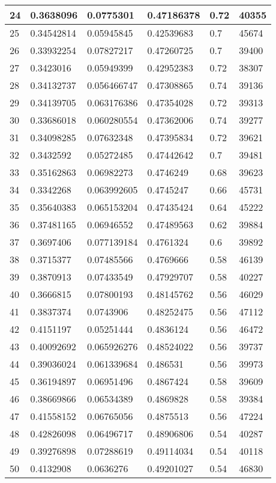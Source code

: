 \begin{longtable}{|l|l|l|l|l|l|}
24 & 0.3638096 & 0.0775301 & 0.47186378 & 0.72 & 40355 \\ \hline 
25 & 0.34542814 & 0.05945845 & 0.42539683 & 0.7 & 45674 \\ \hline 
26 & 0.33932254 & 0.07827217 & 0.47260725 & 0.7 & 39400 \\ \hline 
27 & 0.3423016 & 0.05949399 & 0.42952383 & 0.72 & 38307 \\ \hline 
28 & 0.34132737 & 0.056466747 & 0.47308865 & 0.74 & 39136 \\ \hline 
29 & 0.34139705 & 0.063176386 & 0.47354028 & 0.72 & 39313 \\ \hline 
30 & 0.33686018 & 0.060280554 & 0.47362006 & 0.74 & 39277 \\ \hline 
31 & 0.34098285 & 0.07632348 & 0.47395834 & 0.72 & 39621 \\ \hline 
32 & 0.3432592 & 0.05272485 & 0.47442642 & 0.7 & 39481 \\ \hline 
33 & 0.35162863 & 0.06982273 & 0.4746249 & 0.68 & 39623 \\ \hline 
34 & 0.3342268 & 0.063992605 & 0.4745247 & 0.66 & 45731 \\ \hline 
35 & 0.35640383 & 0.065153204 & 0.47435424 & 0.64 & 45222 \\ \hline 
36 & 0.37481165 & 0.06946552 & 0.47489563 & 0.62 & 39884 \\ \hline 
37 & 0.3697406 & 0.077139184 & 0.4761324 & 0.6 & 39892 \\ \hline 
38 & 0.3715377 & 0.07485566 & 0.4769666 & 0.58 & 46139 \\ \hline 
39 & 0.3870913 & 0.07433549 & 0.47929707 & 0.58 & 40227 \\ \hline 
40 & 0.3666815 & 0.07800193 & 0.48145762 & 0.56 & 46029 \\ \hline 
41 & 0.3837374 & 0.0743906 & 0.48252475 & 0.56 & 47112 \\ \hline 
42 & 0.4151197 & 0.05251444 & 0.4836124 & 0.56 & 46472 \\ \hline 
43 & 0.40092692 & 0.065926276 & 0.48524022 & 0.56 & 39737 \\ \hline 
44 & 0.39036024 & 0.061339684 & 0.486531 & 0.56 & 39973 \\ \hline 
45 & 0.36194897 & 0.06951496 & 0.4867424 & 0.58 & 39609 \\ \hline 
46 & 0.38669866 & 0.06534389 & 0.4869828 & 0.58 & 39384 \\ \hline 
47 & 0.41558152 & 0.06765056 & 0.4875513 & 0.56 & 47224 \\ \hline 
48 & 0.42826098 & 0.06496717 & 0.48906806 & 0.54 & 40287 \\ \hline 
49 & 0.39276898 & 0.07288619 & 0.49114034 & 0.54 & 40118 \\ \hline 
50 & 0.4132908 & 0.0636276 & 0.49201027 & 0.54 & 46830 \\ \hline 
\end{longtable}